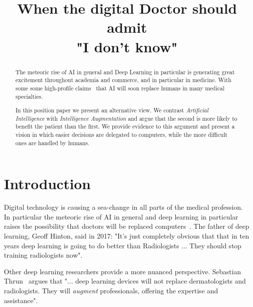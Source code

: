 \documentclass[11pt]{article}
\title{When the digital Doctor should admit\\ "I don't know"}
\begin{document}
\maketitle

\begin{abstract}

  The meteoric rise of AI in general and Deep Learning in particular
  is generating great excitement throughout academia and commerce, and
  in particular in medicine\cite{topol2019deep,
    wachter2015digital}. With some some high-profile claims~\cite{}
  that AI will soon replace humans in many medical specialties.

  In this position paper we present an alternative view. We contrast
  {\em Artificial Intelligence} with {\em Intelligence Augmentation}
  and argue that the second is more likely to benefit the patient than
  the first. We provide evidence to this argument and present a vision
  in which easier decisions are delegated to computers, while the more
  difficult ones are handled by humans.

\end{abstract}

\section*{Introduction}

Digital technology is causing a sea-change in all parts of the medical
profession. In particular the meteoric rise of AI in general and deep
learning in particular raises the possibility that doctors will be
replaced computers~\cite{Mukherjee2017}. The father of deep learning,
Geoff Hinton, said in 2017: "It's just completely obvious that that in
ten years deep learning is going to do better than Radiologists
... They should stop training radiologists now".

Other deep learning researchers provide a more nuanced
perspective. Sebastian
Thrun~\cite{Mukherjee2017,esteva2017dermatologist} argues that
"... deep learning devices will not replace dermatologists and
radiologists. They will {\em augment} professionals, offering the
expertise and assistance".

\end{document}
